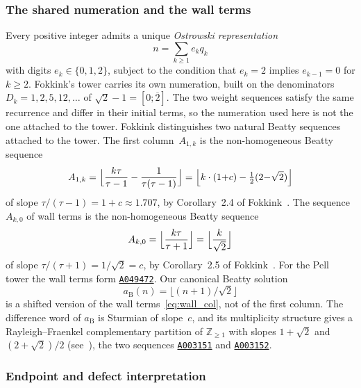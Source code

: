 \documentclass{birkjour}
\theoremstyle{definition}
\theoremstyle{remark}
\begin{document}
\subsubsection*{The shared numeration and the wall terms}

Every positive integer admits a unique
\emph{Ostrowski representation}
\[
  n=\sum_{k\ge 1}e_{k}q_{k}
\]
with digits $e_{k}\in\{0,1,2\}$, subject to the condition
that $e_{k}=2$ implies $e_{k-1}=0$ for $k\ge 2$.
Fokkink's tower carries its own numeration, built on the
denominators $D_{k}=1,2,5,12,\ldots$ of
$\sqrt{2}-1=[0;\overline{2}]$. The two weight sequences
satisfy the same recurrence and differ in their initial
terms, so the numeration used here is not the one attached
to the tower. Fokkink distinguishes two natural Beatty
sequences attached to the tower. The first
column~$A_{1,k}$ is the non-homogeneous Beatty
sequence
\[
  A_{1,k}=\Bigl\lfloor\frac{k\tau}{\tau-1}
  -\frac{1}{\tau(\tau-1)}\Bigr\rfloor
  =\Bigl\lfloor k\cdot(1{+}c)-\tfrac{1}{2}(2{-}\sqrt{2})\Bigr\rfloor
\]
of slope $\tau/(\tau-1)=1+c\approx 1.707$, by
Corollary~2.4 of Fokkink~\cite{Fokkink}. The sequence
$A_{k,0}$ of wall terms is the non-homogeneous Beatty
sequence
\begin{equation}\label{eq:wall_col}
  A_{k,0}=\Bigl\lfloor\frac{k\tau}{\tau+1}\Bigr\rfloor
  =\Bigl\lfloor\frac{k}{\sqrt{2}}\Bigr\rfloor
\end{equation}
of slope $\tau/(\tau+1)=1/\sqrt{2}=c$, by
Corollary~2.5 of Fokkink~\cite{Fokkink}. For the Pell tower
the wall terms form
\href{https://oeis.org/A049472}{\texttt{A049472}}.
Our canonical Beatty solution
\[
  a_{\mathrm{B}}(n)=\bigl\lfloor(n{+}1)/\!\sqrt{2}\bigr\rfloor
\]
is a shifted version of the wall terms~\eqref{eq:wall_col},
not of the first column. The difference word of
$a_{\mathrm{B}}$ is Sturmian of slope~$c$, and its
multiplicity structure gives a Rayleigh--Fraenkel
complementary partition of $\mathbb{Z}_{\ge 1}$
with slopes $1+\sqrt{2}$ and $(2+\sqrt{2})/2$
(see~\cite{Fraenkel}), the two sequences
\href{https://oeis.org/A003151}{\texttt{A003151}} and
\href{https://oeis.org/A003152}{\texttt{A003152}}.

\subsubsection*{Endpoint and defect interpretation}
\end{document}
